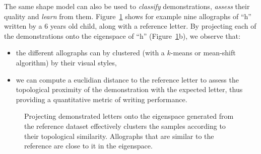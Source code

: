 \documentclass{article}
\begin{document}
The same shape model can also be used to \emph{classify} demonstrations,
\emph{assess} their quality and \emph{learn} from them. Figure~\ref{fig:h} shows
for example nine allographs of ``h'' written by a 6 years old child, along with
a reference letter. By projecting each of the
demonstrations onto the eigenspace of ``h'' (Figure~\ref{fig:h}b), we observe
that:

\begin{itemize}
    \item the different allographs can by clustered (with a $k$-means or
        mean-shift algorithm) by their visual styles,

    \item we can compute a euclidian distance to the reference letter to assess
        the topological proximity of the demonstration with the expected letter,
        thus providing a quantitative metric of writing performance.

\end{itemize}

\begin{figure}[ht!]
    \centering

    \caption{\small Projecting demonstrated letters onto the eigenspace
    generated from the reference dataset effectively clusters the samples
    according to their topological similarity. Allographs that are similar to
    the reference are close to it in the eigenspace.}
    \label{fig:h}
\end{figure}
\end{document}

